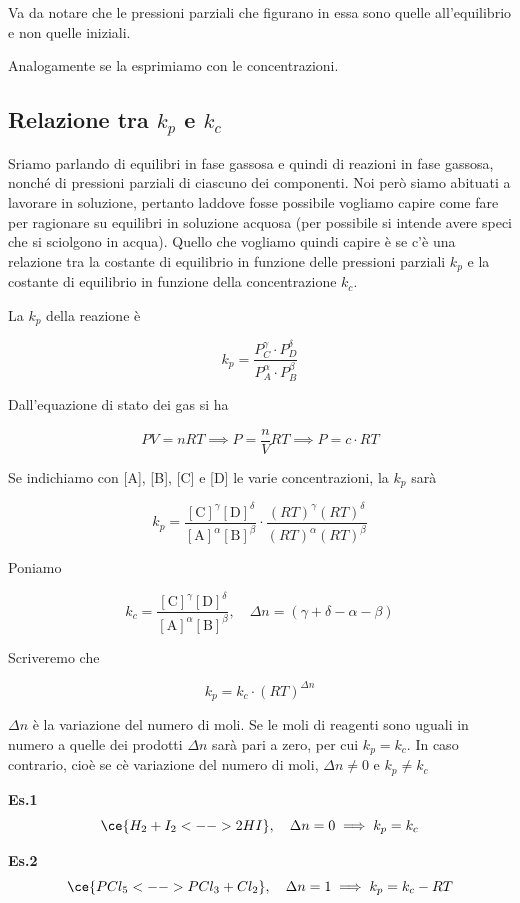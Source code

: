 Va da notare che le pressioni parziali che figurano in essa sono quelle all'equilibrio e non quelle iniziali.

Analogamente se la esprimiamo con le concentrazioni.
\subsection{Relazione tra $k_p$ e $k_c$}
Sriamo parlando di equilibri in fase gassosa e quindi di reazioni in fase gassosa, nonché di pressioni parziali di ciascuno dei componenti. Noi però siamo abituati a lavorare in soluzione, pertanto laddove fosse possibile vogliamo capire come fare per ragionare su equilibri in soluzione acquosa (per possibile si intende avere speci che si sciolgono in acqua). Quello che vogliamo quindi capire è se c'è una relazione tra la costante di equilibrio in funzione delle pressioni parziali $k_p$ e la costante di equilibrio in funzione della concentrazione $k_c$.

La $k_p$ della reazione è

$$k_p = \frac{P_C^{\gamma} \cdot P_D^{\delta}}{P_A^{\alpha} \cdot P_B^{\beta}}$$

Dall'equazione di stato dei gas si ha

$$PV=nRT \implies P=\frac{n}{V}RT \implies P=c \cdot RT$$

Se indichiamo con [A], [B], [C] e [D] le varie concentrazioni, la $k_p$ sarà

$$k_p = \frac{[\text{C}]^{\gamma} [\text{D}]^{\delta}}{[\text{A}]^{\alpha} [\text{B}]^{\beta}} \cdot \frac{(RT)^{\gamma} (RT)^{\delta}}{(RT)^{\alpha} (RT)^{\beta}}$$

Poniamo

$$k_c = \frac{[\text{C}]^{\gamma} [\text{D}]^{\delta}}{[\text{A}]^{\alpha} [\text{B}]^{\beta}}, \quad \Delta n= (\gamma + \delta - \alpha - \beta)$$

Scriveremo che

$$k_p = k_c \cdot (RT)^{\Delta n}$$

$\Delta n$ è la variazione del numero di moli. Se le moli di reagenti sono uguali in numero a quelle dei prodotti $\Delta n$ sarà pari a zero, per cui $k_p = k_c$. In caso contrario, cioè se cè variazione del numero di moli, $\Delta n \neq 0$ e $k_p \neq k_c$

\vspace{0.2cm}\textbf{Es.1}
$$\ce{H_2 + I_2 <--> 2HI}, \quad \Delta n = 0 \implies k_p = k_c$$

\textbf{Es.2}
$$\ce{PCl_5  <--> PCl_3 + Cl_2}, \quad \Delta n = 1 \implies k_p = k_c - RT$$
